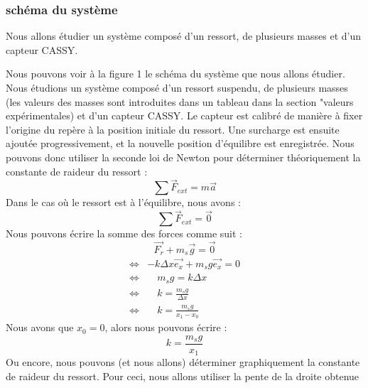         \subsubsection{schéma du système}
            Nous allons étudier un système composé d'un ressort, de plusieurs masses et d'un capteur CASSY.
            
            Nous pouvons voir à la figure 1 le schéma du système que nous allons étudier. Nous étudions 
            un système composé d’un ressort suspendu, de plusieurs masses 
            (les valeurs des masses sont introduites dans un tableau dans la section "valeurs expérimentales) et d’un 
            capteur CASSY. 
            Le capteur est calibré de manière à fixer l’origine du repère à la position initiale du ressort. 
            Une surcharge est ensuite ajoutée progressivement, et la nouvelle position d’équilibre est enregistrée.
            Nous pouvons donc utiliser la seconde loi de Newton pour déterminer théoriquement
            la constante de raideur du ressort : 
            \begin{equation}
                \sum \vec{F}_{ext} = m \vec{a}
            \end{equation}
            Dans le cas où le ressort est à l'équilibre, nous avons :
            \begin{equation}
                \sum \vec{F}_{ext} = \vec{0}
            \end{equation}
            Nous pouvons écrire la somme des forces comme suit :
            \begin{equation}
                \vec{F_r} + m_s\vec{g} = \vec{0}
            \end{equation}
            \begin{align*}
                \Leftrightarrow & -k\Delta x \vec{e_x} + m_s g \vec{e_x} = 0 \\
                \Leftrightarrow & \quad m_s g = k \Delta x \\
                \Leftrightarrow & \quad k = \frac{m_s g}{\Delta x} \\
                \Leftrightarrow & \quad k = \frac{m_s g}{x_1 - x_0}
            \end{align*}
            Nous avons que $x_0 = 0$, alors nous pouvons écrire :
            \begin{equation}
                k = \frac{m_s g}{x_1}
            \end{equation}
            Ou encore, nous pouvons (et nous allons) déterminer graphiquement la constante
            de raideur du ressort. Pour ceci, nous allons utiliser la pente de la droite obtenue
